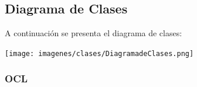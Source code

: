 \documentclass[spanish, 10pt,a4paper]{article}
\numberwithin{equation}{section} %
\begin{document}
\subsection{Diagrama de Clases}
	A continuación se presenta el diagrama de clases:

\vspace{\baselineskip}
    \begin{center}
                \texttt{[image: imagenes/clases/DiagramadeClases.png]}
                \\
                \vspace{1pt}
                \footnotesize\textit{}
        \end{center}
\vspace{\baselineskip}

\subsubsection{OCL}
\end{document}
